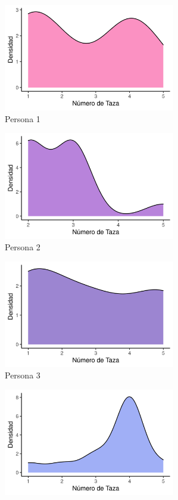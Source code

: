 \begin{figure}[H]
    \centering
    \begin{subfigure}[b]{8cm}
        \includegraphics[width=7.5cm]{Graphics/problema06_1.png}
        \caption{Persona 1}
    \end{subfigure}
    \begin{subfigure}[b]{8cm}
        \includegraphics[width=7.5cm]{Graphics/problema06_2.png}
        \caption{Persona 2}
    \end{subfigure}
    \begin{subfigure}[b]{8cm}
        \includegraphics[width=7.5cm]{Graphics/problema06_3.png}
        \caption{Persona 3}
    \end{subfigure}
    \begin{subfigure}[b]{8cm}
        \includegraphics[width=7.5cm]{Graphics/problema06_4.png}

\end{subfigure}
\end{figure}
